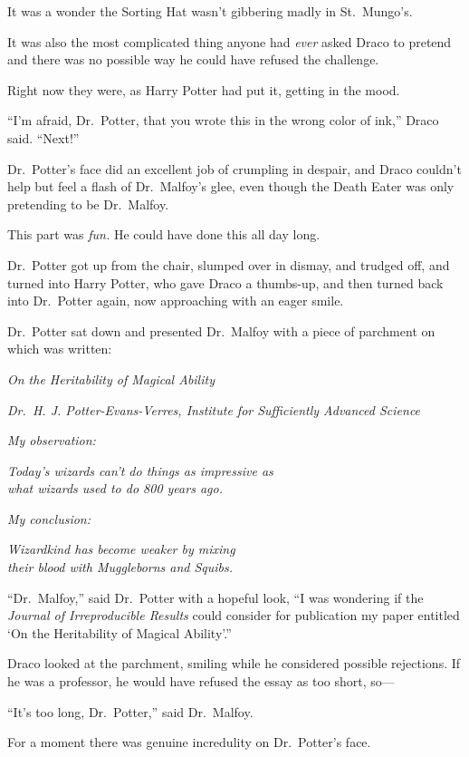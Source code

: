It was a wonder the Sorting Hat wasn't gibbering madly in St.~Mungo's.

It was also the most complicated thing anyone had \emph{ever} asked
Draco to pretend and there was no possible way he could have refused the
challenge.

Right now they were, as Harry Potter had put it, getting in the mood.

``I'm afraid, Dr.~Potter, that you wrote this in the wrong color of
ink,'' Draco said. ``Next!''

Dr.~Potter's face did an excellent job of crumpling in despair, and
Draco couldn't help but feel a flash of Dr.~Malfoy's glee, even though
the Death Eater was only pretending to be Dr.~Malfoy.

This part was \emph{fun.} He could have done this all day long.

Dr.~Potter got up from the chair, slumped over in dismay, and trudged
off, and turned into Harry Potter, who gave Draco a thumbs-up, and then
turned back into Dr.~Potter again, now approaching with an eager smile.

Dr.~Potter sat down and presented Dr.~Malfoy with a piece of parchment
on which was written:

\emph{On the Heritability of Magical Ability}

\emph{Dr.~H. J. Potter-Evans-Verres, Institute for Sufficiently Advanced
Science}

\emph{My observation:}

\emph{Today's wizards can't do things as impressive as\\what wizards
used to do 800 years ago.}

\emph{My conclusion:}

\emph{Wizardkind has become weaker by mixing\\their blood with
Muggleborns and Squibs.}

``Dr.~Malfoy,'' said Dr.~Potter with a hopeful look, ``I was wondering
if the \emph{Journal of Irreproducible Results} could consider for
publication my paper entitled `On the Heritability of Magical
Ability'.''

Draco looked at the parchment, smiling while he considered possible
rejections. If he was a professor, he would have refused the essay as
too short, so---

``It's too long, Dr.~Potter,'' said Dr.~Malfoy.

For a moment there was genuine incredulity on Dr.~Potter's face.

